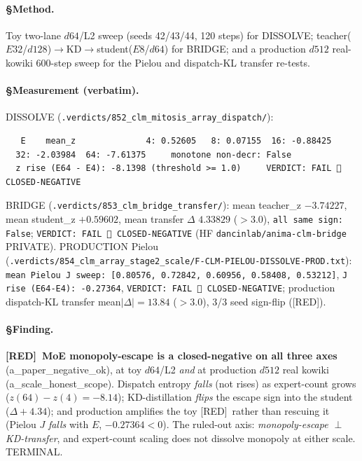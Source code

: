 \documentclass[11pt,a4paper]{article}
\providecommand{\tierRed}{[RED]}
\begin{document}
\paragraph{§Method.} Toy two-lane $d64$/L2 sweep (seeds 42/43/44, 120 steps) for
DISSOLVE; teacher($E32$/$d128$)$\to$KD$\to$student($E8$/$d64$) for BRIDGE; and a
production $d512$ real-kowiki 600-step sweep for the Pielou and dispatch-KL transfer
re-tests.

\paragraph{§Measurement (verbatim).}
DISSOLVE (\texttt{.verdicts/852\_clm\_mitosis\_array\_dispatch/}):
\begin{verbatim}
   E    mean_z              4: 0.52605   8: 0.07155  16: -0.88425
  32: -2.03984  64: -7.61375     monotone non-decr: False
  z rise (E64 - E4): -8.1398 (threshold >= 1.0)     VERDICT: FAIL 🔴 CLOSED-NEGATIVE
\end{verbatim}
BRIDGE (\texttt{.verdicts/853\_clm\_bridge\_transfer/}): mean teacher\_z $-3.74227$,
mean student\_z $+0.59602$, mean transfer $\Delta$ $4.33829$ ($>3.0$),
\texttt{all same sign: False}; \texttt{VERDICT: FAIL 🔴 CLOSED-NEGATIVE} (HF
\texttt{dancinlab/anima-clm-bridge} PRIVATE). PRODUCTION Pielou
(\texttt{.verdicts/854\_clm\_array\_stage2\_scale/F-CLM-PIELOU-DISSOLVE-PROD.txt}):
\texttt{mean Pielou J sweep: [0.80576, 0.72842, 0.60956, 0.58408, 0.53212]},
\texttt{J rise (E64-E4): -0.27364}, \texttt{VERDICT: FAIL 🔴 CLOSED-NEGATIVE};
production dispatch-KL transfer mean$|\Delta|=13.84$ ($>3.0$), 3/3 seed sign-flip
(\tierRed).

\paragraph{§Finding.} \textbf{\tierRed\ MoE monopoly-escape is a closed-negative on
all three axes} (a\_paper\_negative\_ok), at toy $d64$/L2 \emph{and} at production
$d512$ real kowiki (a\_scale\_honest\_scope). Dispatch entropy \emph{falls} (not
rises) as expert-count grows ($z(64)-z(4)=-8.14$); KD-distillation \emph{flips} the
escape sign into the student ($\Delta +4.34$); and production amplifies the toy
\tierRed\ rather than rescuing it (Pielou $J$ \emph{falls} with $E$,
$-0.27364<0$). The ruled-out axis: \emph{monopoly-escape $\perp$ KD-transfer}, and
expert-count scaling does not dissolve monopoly at either scale. TERMINAL.

\end{document}
